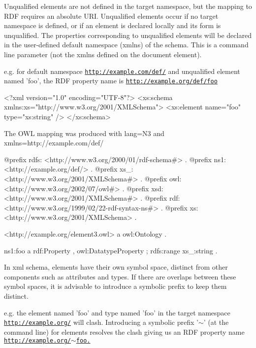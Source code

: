Unqualified elements are not defined in the target namespace, but the mapping to RDF requires an absolute URI. Unqualified elements occur if no target namespace is defined, or if an element is declared locally and its form is unqualified. The properties corresponding to unqualified elements will be declared in the user-\/defined default namespace (xmlns) of the schema. This is a command line parameter (not the xmlns defined on the document element).

e.g. for default namespace \href{http://example.com/def/}{\tt http://example.com/def/} and unqualified element named 'foo', the RDF property name is \href{http://example.org/def/foo}{\tt http://example.org/def/foo}


\begin{DoxyCodeInclude}
<?xml version="1.0" encoding="UTF-8"?>
<xs:schema xmlns:xs="http://www.w3.org/2001/XMLSchema">
        <xs:element name="foo" type="xs:string" />
</xs:schema>
\end{DoxyCodeInclude}


The OWL mapping was produced with lang=N3 and xmlns=http://example.com/def/


\begin{DoxyCodeInclude}
@prefix rdfs:    <http://www.w3.org/2000/01/rdf-schema#> .
@prefix ns1:     <http://example.org/def/> .
@prefix xs_:     <http://www.w3.org/2001/XMLSchema#> .
@prefix owl:     <http://www.w3.org/2002/07/owl#> .
@prefix xsd:     <http://www.w3.org/2001/XMLSchema#> .
@prefix rdf:     <http://www.w3.org/1999/02/22-rdf-syntax-ns#> .
@prefix xs:      <http://www.w3.org/2001/XMLSchema> .

<http://example.org/element3.owl>
      a       owl:Ontology .

ns1:foo
      a       rdf:Property , owl:DatatypeProperty ;
      rdfs:range xs_:string .
\end{DoxyCodeInclude}


In xml schema, elements have their own symbol space, distinct from other components such as attributes and types. If there are overlaps between these symbol spaces, it is advisable to introduce a symbolic prefix to keep them distinct.

e.g. the element named 'foo' and type named 'foo' in the target namespace \href{http://example.org/}{\tt http://example.org/} will clash. Introducing a symbolic prefix '$\sim$' (at the command line) for elements resolves the clash giving us an RDF property name \href{http://example.org/~foo.}{\tt http://example.org/$\sim$foo.}


